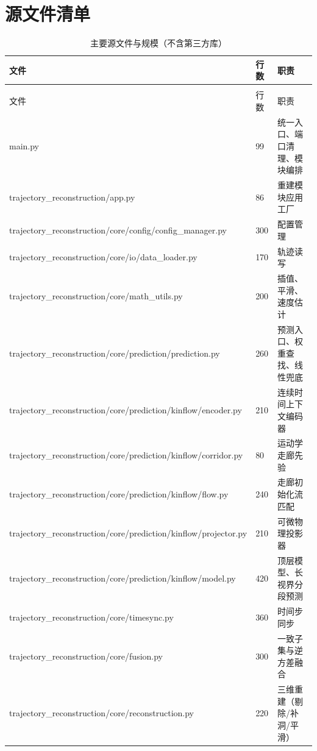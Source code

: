 \section{源文件清单}

\begin{longtable}{@{}>{\raggedright\ttfamily\scriptsize}p{8.0cm}>{\scriptsize}p{1.2cm}>{\raggedright\arraybackslash}p{4.3cm}@{}}
\caption{主要源文件与规模（不含第三方库）}\label{tab:files}\\
\toprule
文件 & 行数 & 职责 \\
\midrule
\endfirsthead
\multicolumn{3}{@{}l}{\small 续表~\thetable}\\
\toprule
文件 & 行数 & 职责 \\
\midrule
\endhead
\bottomrule
\endlastfoot
main.py & 99 & 统一入口、端口清理、模块编排 \\
trajectory\_reconstruction/app.py & 86 & 重建模块应用工厂 \\
trajectory\_reconstruction/core/config/config\_manager.py & 300 & 配置管理 \\
trajectory\_reconstruction/core/io/data\_loader.py & 170 & 轨迹读写 \\
trajectory\_reconstruction/core/math\_utils.py & 200 & 插值、平滑、速度估计 \\
trajectory\_reconstruction/core/prediction/prediction.py & 260 & 预测入口、权重查找、线性兜底 \\
trajectory\_reconstruction/core/prediction/kinflow/\allowbreak encoder.py & 210 & 连续时间上下文编码器 \\
trajectory\_reconstruction/core/prediction/kinflow/\allowbreak corridor.py & 80 & 运动学走廊先验 \\
trajectory\_reconstruction/core/prediction/kinflow/\allowbreak flow.py & 240 & 走廊初始化流匹配 \\
trajectory\_reconstruction/core/prediction/kinflow/\allowbreak projector.py & 210 & 可微物理投影器 \\
trajectory\_reconstruction/core/prediction/kinflow/\allowbreak model.py & 420 & 顶层模型、长视界分段预测 \\
trajectory\_reconstruction/core/timesync.py & 360 & 时间步同步 \\
trajectory\_reconstruction/core/fusion.py & 300 & 一致子集与逆方差融合 \\
trajectory\_reconstruction/core/reconstruction.py & 220 & 三维重建（剔除/补洞/平滑） \\

\end{longtable}
